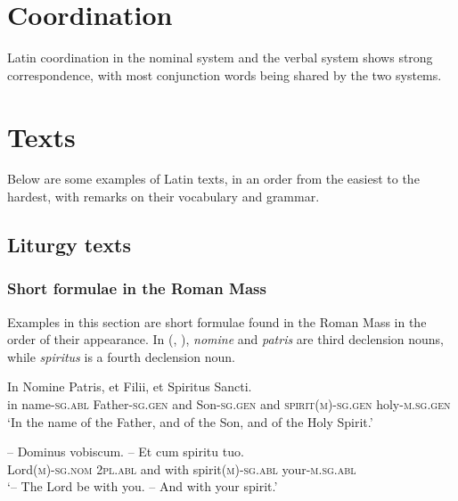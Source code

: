 \documentclass[a4paper, oneside, 12pt]{report}
\newcommand{\form}[1]{\emph{#1}}
\newcommand*{\category}[1]{\textsc{#1}}
\newcommand{\translate}[1]{`#1'}
\begin{document}
\chapter{Coordination}

Latin coordination in the nominal system and the verbal system 
shows strong correspondence,
with most conjunction words being shared
by the two systems.


\chapter{Texts}

Below are some examples of Latin texts, 
in an order from the easiest to the hardest,
with remarks on their vocabulary and grammar. 

\section{Liturgy texts}

\subsection{Short formulae in the Roman Mass}

Examples in this section are short formulae found in the Roman Mass
in the order of their appearance.
In (, ),
\form{nomine} and \form{patris} are third declension nouns, 
while \form{spiritus} is a fourth declension noun. 

\begin{exe}
    \ex\label{ex:text.mass.1} \gll In Nomine Patris, et Filii, et Spiritus Sancti. \\
    in name-\category{sg}.\category{abl} Father-\category{sg}.\category{gen} 
    and Son-\category{sg}.\category{gen} 
    and \category{spirit}(\category{m})-\category{sg}.\category{gen}
    holy-\category{m}.\category{sg}.\category{gen} \\
    \glt \translate{In the name of the Father, and of the Son, and of the Holy Spirit.}

    \ex\label{ex:text.mass.2} \gll -- Dominus vobiscum. -- Et cum spiritu tuo. \\
    {} Lord(\category{m})-\category{sg}.\category{nom} 
    \category{2pl}.\category{abl} 
    {} and with spirit(\category{m})-\category{sg}.\category{abl} 
    your-\category{m}.\category{sg}.\category{abl} \\
    \glt \translate{-- The Lord be with you. -- And with your spirit.}
    
    \ex 
\end{exe}
\end{document}
